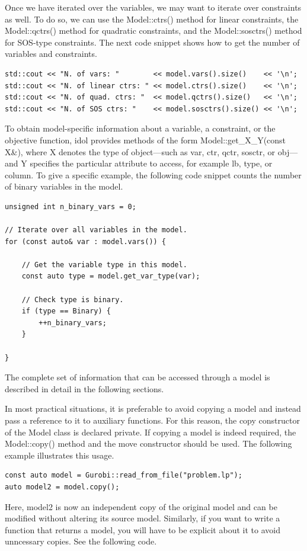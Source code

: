 Once we have iterated over the variables, we may want to iterate over
constraints as well. To do so, we can use the \textsf{Model::ctrs()} method
for linear constraints, the \textsf{Model::qctrs()} method for quadratic
constraints, and the \textsf{Model::sosctrs()} method for SOS-type
constraints. The next code snippet shows how to get the number of variables
and constraints.
%
\begin{lstlisting}
std::cout << "N. of vars: "        << model.vars().size()    << '\n';
std::cout << "N. of linear ctrs: " << model.ctrs().size()    << '\n';
std::cout << "N. of quad. ctrs: "  << model.qctrs().size()   << '\n';
std::cout << "N. of SOS ctrs: "    << model.sosctrs().size() << '\n';
\end{lstlisting}

To obtain model-specific information about a variable, a constraint, or the
objective function, \textsf{idol} provides methods of the form
\textsf{Model::get\_X\_Y(const X\&)}, where \textsf{X} denotes the type of
object—such as \textsf{var}, \textsf{ctr}, \textsf{qctr}, \textsf{sosctr}, or
\textsf{obj}—and \textsf{Y} specifies the particular attribute to access, for
example \textsf{lb}, \textsf{type}, or \textsf{column}. To give a specific
example, the following code snippet counts the number of binary variables in
the model.
%
\begin{lstlisting}
unsigned int n_binary_vars = 0;

// Iterate over all variables in the model.
for (const auto& var : model.vars()) {

    // Get the variable type in this model.
    const auto type = model.get_var_type(var);

    // Check type is binary.
    if (type == Binary) {
        ++n_binary_vars;
    }

}
\end{lstlisting}

The complete set of information that can be accessed through a model is
described in detail in the following sections.

In most practical situations, it is preferable to avoid copying a model and
instead pass a reference to it to auxiliary functions. For this reason, the
copy constructor of the \textsf{Model} class is declared \textsf{private}. If
copying a model is indeed required, the \textsf{Model::copy()} method and the
move constructor should be used. The following example illustrates this usage. 
%
\begin{lstlisting}
const auto model = Gurobi::read_from_file("problem.lp");
auto model2 = model.copy();
\end{lstlisting}
Here, \textsf{model2} is now an independent copy of the original model and can
be modified without altering its source model. Similarly, if you want to write
a function that returns a model, you will have to be explicit about it to
avoid unncessary copies. See the following code.

